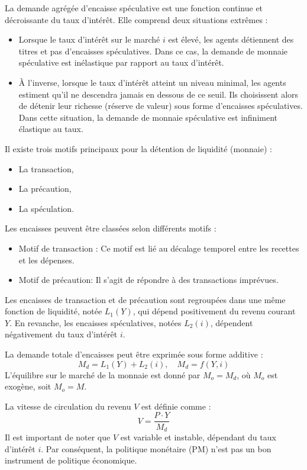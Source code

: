 \documentclass[a4paper, 12pt]{report}
\begin{document}
La demande agrégée d'encaisse spéculative est une fonction continue et décroissante du taux d'intérêt. Elle comprend deux situations extrêmes :

\begin{itemize}
	\item Lorsque le taux d'intérêt sur le marché \( i \) est élevé, les agents détiennent des titres et pas d'encaisses spéculatives. Dans ce cas, la demande de monnaie spéculative est inélastique par rapport au taux d'intérêt.
	\item À l'inverse, lorsque le taux d'intérêt atteint un niveau minimal, les agents estiment qu'il ne descendra jamais en dessous de ce seuil. Ils choisissent alors de détenir leur richesse (réserve de valeur) sous forme d'encaisses spéculatives. Dans cette situation, la demande de monnaie spéculative est infiniment élastique au taux.
\end{itemize}

Il existe trois motifs principaux pour la détention de liquidité (monnaie) : 
\begin{itemize}
	\item La transaction,
	\item La précaution,
	\item La spéculation.
\end{itemize}

Les encaisses peuvent être classées selon différents motifs :

\begin{itemize}
	\item Motif de transaction : Ce motif est lié au décalage temporel entre les recettes et les dépenses.
	\item Motif de précaution: Il s'agit de répondre à des transactions imprévues.
\end{itemize}

Les encaisses de transaction et de précaution sont regroupées dans une même fonction de liquidité, notée \( L_1(Y) \), qui dépend positivement du revenu courant \( Y \). En revanche, les encaisses spéculatives, notées \( L_2(i) \), dépendent négativement du taux d'intérêt \( i \).

La demande totale d'encaisses peut être exprimée sous forme additive :
\[
M_d = L_1(Y) + L_2(i), \quad M_d = f(Y, i)
\]
L'équilibre sur le marché de la monnaie est donné par \( M_o = M_d \), où \( M_o \) est exogène, soit \( M_o = M \).

La vitesse de circulation du revenu \( V \) est définie comme :
\[
V = \frac{P \cdot Y}{M_d}
\]
Il est important de noter que \( V \) est variable et instable, dépendant du taux d'intérêt \( i \). Par conséquent, la politique monétaire (PM) n'est pas un bon instrument de politique économique.
\end{document}
